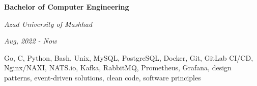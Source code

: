\documentclass{engineercv}
\begin{document}
\begin{minipage}{\textwidth}
  \begin{multicols}{2}
    \begin{minipage}{0.5\textwidth}
      \textbf{Bachelor of Computer Engineering}

      \textit{Azad University of Mashhad}

      \textit{Aug, 2022 - Now}
    \end{minipage}
    \columnbreak
    \begin{minipage}{0.5\textwidth}
      Go, C, Python, Bash, Unix, MySQL, PostgreSQL, Docker, Git, GitLab CI/CD,
      Nginx/NAXI, NATS.io, Kafka, RabbitMQ, Prometheus, Grafana, design patterns,
      event-driven solutions, clean code, software principles
    \end{minipage}
  \end{multicols}
\end{minipage}
\end{document}
